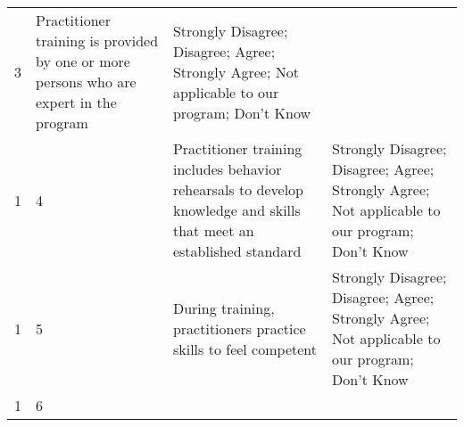 \documentclass[]{article}
\begin{document}
\begin{longtable}[]{@{}llll@{}}
\begin{minipage}[t]{0.04\columnwidth}
3\strut
\end{minipage} & \begin{minipage}[t]{0.41\columnwidth}\raggedright\strut
Practitioner training is provided by one or more persons who are expert
in the program\strut
\end{minipage} & \begin{minipage}[t]{0.39\columnwidth}\raggedright\strut
Strongly Disagree; Disagree; Agree; Strongly Agree; Not applicable to
our program; Don't Know\strut
\end{minipage}\tabularnewline
\begin{minipage}[t]{0.05\columnwidth}\raggedright\strut
1\strut
\end{minipage} & \begin{minipage}[t]{0.04\columnwidth}\raggedright\strut
4\strut
\end{minipage} & \begin{minipage}[t]{0.41\columnwidth}\raggedright\strut
Practitioner training includes behavior rehearsals to develop knowledge
and skills that meet an established standard\strut
\end{minipage} & \begin{minipage}[t]{0.39\columnwidth}\raggedright\strut
Strongly Disagree; Disagree; Agree; Strongly Agree; Not applicable to
our program; Don't Know\strut
\end{minipage}\tabularnewline
\begin{minipage}[t]{0.05\columnwidth}\raggedright\strut
1\strut
\end{minipage} & \begin{minipage}[t]{0.04\columnwidth}\raggedright\strut
5\strut
\end{minipage} & \begin{minipage}[t]{0.41\columnwidth}\raggedright\strut
During training, practitioners practice skills to feel competent\strut
\end{minipage} & \begin{minipage}[t]{0.39\columnwidth}\raggedright\strut
Strongly Disagree; Disagree; Agree; Strongly Agree; Not applicable to
our program; Don't Know\strut
\end{minipage}\tabularnewline
\begin{minipage}[t]{0.05\columnwidth}\raggedright\strut
1\strut
\end{minipage} & \begin{minipage}[t]{0.04\columnwidth}\raggedright\strut
6\strut
\end{minipage} & \begin{minipage}[t]{0.41\columnwidth}\raggedright\strut

\end{minipage}
\end{longtable}
\end{document}
